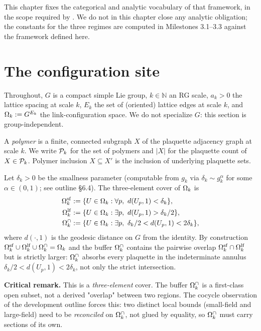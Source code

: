 This chapter fixes the categorical and analytic vocabulary of that framework, in the scope required by .  We do not in this chapter close any analytic obligation; the constants for the three regimes are computed in Milestones 3.1--3.3 against the framework defined here.

\section{The configuration site}
\label{sec:site}

Throughout, $G$ is a compact simple Lie group, $k \in \mathbb{N}$ an RG scale, $a_k > 0$ the lattice spacing at scale $k$, $E_k$ the set of (oriented) lattice edges at scale $k$, and $\Omega_k := G^{E_k}$ the link-configuration space.  We do not specialize $G$: this section is group-independent.

\begin{definition}[Polymer]
\label{def:polymer}
A \emph{polymer} is a finite, connected subgraph $X$ of the plaquette adjacency graph at scale $k$.  We write $\mathcal{P}_k$ for the set of polymers and $|X|$ for the plaquette count of $X \in \mathcal{P}_k$.  Polymer inclusion $X \subseteq X'$ is the inclusion of underlying plaquette sets.
\end{definition}

\begin{definition}
\label{def:three-cover}
Let $\delta_k > 0$ be the smallness parameter (computable from $g_k$ via $\delta_k \sim g_k^\alpha$ for some $\alpha \in (0,1)$; see outline \S6.4).  The three-element cover of $\Omega_k$ is
\begin{align*}
  \Omega_k^{\mathrm{sf}}  &:= \{ U \in \Omega_k : \forall p,\ d(U_p, 1) < \delta_k \},\\
  \Omega_k^{\mathrm{lf}}  &:= \{ U \in \Omega_k : \exists p,\ d(U_p, 1) > \delta_k / 2 \},\\
  \Omega_k^{\cap} &:= \{ U \in \Omega_k : \exists p,\ \delta_k / 2 < d(U_p, 1) < 2 \delta_k \},
\end{align*}
where $d(\cdot, 1)$ is the geodesic distance on $G$ from the identity.  By construction $\Omega_k^{\mathrm{sf}} \cup \Omega_k^{\mathrm{lf}} \cup \Omega_k^{\cap} = \Omega_k$ and the buffer $\Omega_k^{\cap}$ contains the pairwise overlap $\Omega_k^{\mathrm{sf}} \cap \Omega_k^{\mathrm{lf}}$ but is strictly larger: $\Omega_k^{\cap}$ absorbs every plaquette in the indeterminate annulus $\delta_k / 2 < d(U_p, 1) < 2 \delta_k$, not only the strict intersection.

\textbf{Critical remark.}  This is a \emph{three-element} cover.  The buffer $\Omega_k^{\cap}$ is a first-class open subset, not a derived "overlap" between two regions.  The cocycle observation of the development outline forces this: two distinct local bounds (small-field and large-field) need to be \emph{reconciled} on $\Omega_k^{\cap}$, not glued by equality, so $\Omega_k^{\cap}$ must carry sections of its own.
\end{definition}

